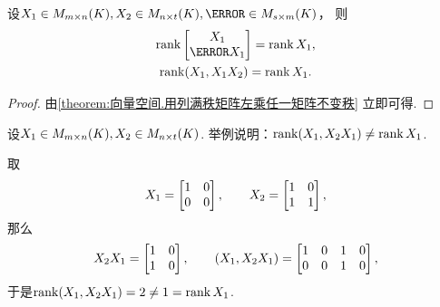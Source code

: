 \begin{corollary}\label{theorem:西尔维斯特不等式.分块矩阵的秩的等式3}
设\(\A \in M_{m \times n}(K),
\B \in M_{n \times t}(K),
\C \in M_{s \times m}(K)\)，
则\begin{gather*}
	\rank\begin{bmatrix}
		\A \\
		\C \A
	\end{bmatrix}
	= \rank\A, \\
	\rank(\A,\A \B)
	= \rank\A.
\end{gather*}
\begin{proof}
由\cref{theorem:向量空间.用列满秩矩阵左乘任一矩阵不变秩} 立即可得.
\end{proof}
\end{corollary}
\begin{example}
设\(X_1 \in M_{m \times n}(K),
X_2 \in M_{n \times t}(K)\).
举例说明：\(\rank(X_1,X_2 X_1) \neq \rank X_1\).
\begin{solution}
取\[
	X_1 = \begin{bmatrix}
		1 & 0 \\
		0 & 0
	\end{bmatrix},
	\qquad
	X_2 = \begin{bmatrix}
		1 & 0 \\
		1 & 1
	\end{bmatrix},
\]
那么\[
	X_2 X_1 = \begin{bmatrix}
		1 & 0 \\
		1 & 0
	\end{bmatrix},
	\qquad
	(X_1,X_2 X_1) = \begin{bmatrix}
		1 & 0 & 1 & 0 \\
		0 & 0 & 1 & 0
	\end{bmatrix},
\]
于是\(\rank(X_1,X_2 X_1) = 2 \neq 1 = \rank X_1\).
\end{solution}
\end{example}
